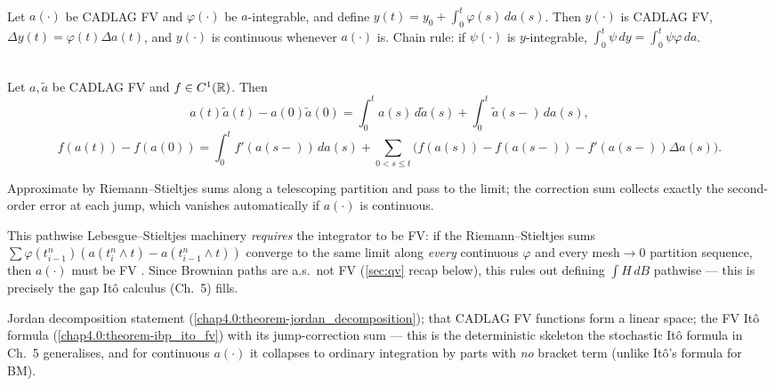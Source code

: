 \begin{proposition} \label{chap4.0:proposition-a_absolute_continuity}  \\
Let $a(\cdot)$ be CADLAG FV and $\varphi(\cdot)$ be $a$-integrable, and define $y(t)=y_0+\int_0^t\varphi(s)\,da(s)$. Then $y(\cdot)$ is CADLAG FV, $\Delta y(t)=\varphi(t)\Delta a(t)$, and $y(\cdot)$ is continuous whenever $a(\cdot)$ is. Chain rule: if $\psi(\cdot)$ is $y$-integrable, $\int_0^t\psi\,dy=\int_0^t\psi\varphi\,da$.
\end{proposition}

\begin{theorem} \label{chap4.0:theorem-ibp_ito_fv}  \\
Let $a,\tilde a$ be CADLAG FV and $f\in C^1(\mathbb{R})$. Then
$$a(t)\tilde a(t)-a(0)\tilde a(0)=\int_0^t a(s)\,d\tilde a(s)+\int_0^t\tilde a(s-)\,da(s),$$
$$f(a(t))-f(a(0))=\int_0^t f'(a(s-))\,da(s)+\sum_{0<s\le t}\Big(f(a(s))-f(a(s-))-f'(a(s-))\Delta a(s)\Big).$$
\end{theorem}
\begin{proofidea} Approximate by Riemann--Stieltjes sums along a telescoping partition and pass to the limit; the correction sum collects exactly the second-order error at each jump, which vanishes automatically if $a(\cdot)$ is continuous. \end{proofidea}

\begin{trap} This pathwise Lebesgue--Stieltjes machinery \emph{requires} the integrator to be FV: if the Riemann--Stieltjes sums $\sum\varphi(t^n_{i-1})(a(t^n_i\wedge t)-a(t^n_{i-1}\wedge t))$ converge to the same limit along \emph{every} continuous $\varphi$ and every mesh$\to0$ partition sequence, then $a(\cdot)$ must be FV . Since Brownian paths are a.s.\ not FV (\cref{sec:qv} recap below), this rules out defining $\int H\,dB$ pathwise --- this is precisely the gap Itô calculus (Ch.\ 5) fills. \end{trap}
\begin{quizbox} Jordan decomposition statement (\cref{chap4.0:theorem-jordan_decomposition}); that CADLAG FV functions form a linear space; the FV Itô formula (\cref{chap4.0:theorem-ibp_ito_fv}) with its jump-correction sum --- this is the deterministic skeleton the stochastic Itô formula in Ch.\ 5 generalises, and for continuous $a(\cdot)$ it collapses to ordinary integration by parts with \emph{no} bracket term (unlike Itô's formula for BM). \end{quizbox}

